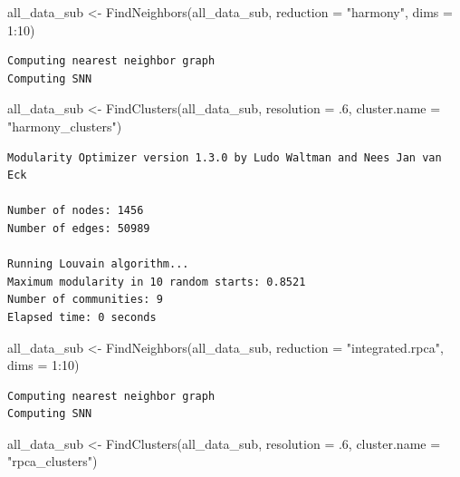 \documentclass[
  letterpaper,
  DIV=11,
  numbers=noendperiod]{scrreprt}
\newenvironment{Shaded}{\begin{snugshade}}{\end{snugshade}}
\newcommand{\AttributeTok}[1]{\textcolor[rgb]{0.40,0.45,0.13}{#1}}
\newcommand{\DecValTok}[1]{\textcolor[rgb]{0.68,0.00,0.00}{#1}}
\newcommand{\FunctionTok}[1]{\textcolor[rgb]{0.28,0.35,0.67}{#1}}
\newcommand{\NormalTok}[1]{\textcolor[rgb]{0.00,0.23,0.31}{#1}}
\newcommand{\OtherTok}[1]{\textcolor[rgb]{0.00,0.23,0.31}{#1}}
\newcommand{\SpecialCharTok}[1]{\textcolor[rgb]{0.37,0.37,0.37}{#1}}
\newcommand{\StringTok}[1]{\textcolor[rgb]{0.13,0.47,0.30}{#1}}
\begin{document}
\begin{Shaded}
\begin{Highlighting}[]
\NormalTok{all\_data\_sub }\OtherTok{\textless{}{-}} \FunctionTok{FindNeighbors}\NormalTok{(all\_data\_sub, }\AttributeTok{reduction =} \StringTok{"harmony"}\NormalTok{, }\AttributeTok{dims =} \DecValTok{1}\SpecialCharTok{:}\DecValTok{10}\NormalTok{)}
\end{Highlighting}
\end{Shaded}

\begin{verbatim}
Computing nearest neighbor graph
Computing SNN
\end{verbatim}

\begin{Shaded}
\begin{Highlighting}[]
\NormalTok{all\_data\_sub }\OtherTok{\textless{}{-}} \FunctionTok{FindClusters}\NormalTok{(all\_data\_sub, }\AttributeTok{resolution =}\NormalTok{ .}\DecValTok{6}\NormalTok{, }\AttributeTok{cluster.name =} \StringTok{"harmony\_clusters"}\NormalTok{)}
\end{Highlighting}
\end{Shaded}

\begin{verbatim}
Modularity Optimizer version 1.3.0 by Ludo Waltman and Nees Jan van Eck

Number of nodes: 1456
Number of edges: 50989

Running Louvain algorithm...
Maximum modularity in 10 random starts: 0.8521
Number of communities: 9
Elapsed time: 0 seconds
\end{verbatim}

\begin{Shaded}
\begin{Highlighting}[]
\NormalTok{all\_data\_sub }\OtherTok{\textless{}{-}} \FunctionTok{FindNeighbors}\NormalTok{(all\_data\_sub, }\AttributeTok{reduction =} \StringTok{"integrated.rpca"}\NormalTok{, }\AttributeTok{dims =} \DecValTok{1}\SpecialCharTok{:}\DecValTok{10}\NormalTok{)}
\end{Highlighting}
\end{Shaded}

\begin{verbatim}
Computing nearest neighbor graph
Computing SNN
\end{verbatim}

\begin{Shaded}
\begin{Highlighting}[]
\NormalTok{all\_data\_sub }\OtherTok{\textless{}{-}} \FunctionTok{FindClusters}\NormalTok{(all\_data\_sub, }\AttributeTok{resolution =}\NormalTok{ .}\DecValTok{6}\NormalTok{, }\AttributeTok{cluster.name =} \StringTok{"rpca\_clusters"}\NormalTok{)}
\end{Highlighting}
\end{Shaded}
\end{document}
